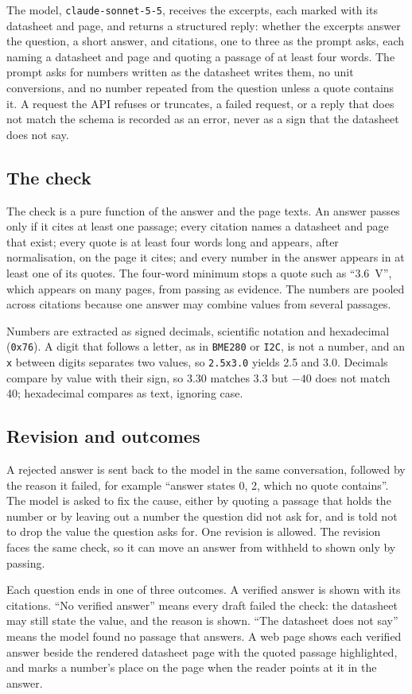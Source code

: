 The model, \texttt{claude-sonnet-5-5}, receives the excerpts, each marked with its datasheet and page, and returns a structured reply: whether the excerpts answer the question, a short answer, and citations, one to three as the prompt asks, each naming a datasheet and page and quoting a passage of at least four words. The prompt asks for numbers written as the datasheet writes them, no unit conversions, and no number repeated from the question unless a quote contains it. A request the API refuses or truncates, a failed request, or a reply that does not match the schema is recorded as an error, never as a sign that the datasheet does not say.

\subsection{The check}

The check is a pure function of the answer and the page texts. An answer passes only if it cites at least one passage; every citation names a datasheet and page that exist; every quote is at least four words long and appears, after normalisation, on the page it cites; and every number in the answer appears in at least one of its quotes. The four-word minimum stops a quote such as \enquote{\qty{3.6}{\volt}}, which appears on many pages, from passing as evidence. The numbers are pooled across citations because one answer may combine values from several passages.

Numbers are extracted as signed decimals, scientific notation and hexadecimal (\texttt{0x76}). A digit that follows a letter, as in \texttt{BME280} or \texttt{I2C}, is not a number, and an \texttt{x} between digits separates two values, so \texttt{2.5x3.0} yields 2.5 and 3.0. Decimals compare by value with their sign, so 3.30 matches 3.3 but $-40$ does not match 40; hexadecimal compares as text, ignoring case.

\subsection{Revision and outcomes}

A rejected answer is sent back to the model in the same conversation, followed by the reason it failed, for example \enquote{answer states 0, 2, which no quote contains}. The model is asked to fix the cause, either by quoting a passage that holds the number or by leaving out a number the question did not ask for, and is told not to drop the value the question asks for. One revision is allowed. The revision faces the same check, so it can move an answer from withheld to shown only by passing.

Each question ends in one of three outcomes. A verified answer is shown with its citations. \enquote{No verified answer} means every draft failed the check: the datasheet may still state the value, and the reason is shown. \enquote{The datasheet does not say} means the model found no passage that answers. A web page shows each verified answer beside the rendered datasheet page with the quoted passage highlighted, and marks a number's place on the page when the reader points at it in the answer.
